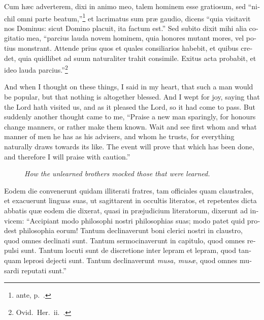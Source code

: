 \documentclass[10pt]{book}
\newcounter{engnote}
\newcommand{\engnotetext}[1]{\vphantom{\footnotemark{}}\footnotetext{#1}}
\newcommand{\blockhead}[4][]{
\begin{figure}
\centering
\vspace{#4}
\parbox{2.75cm}{\begin{center}\footnotesize \color{BrickRed} \emph{#2}\\ #1 \end{center}}
\end{figure}
}
\begin{document}
\begin{paracol}{2}
\switchcolumn*

\begin{otherlanguage}{latin}
Cum h\ae{}c adverterem, dixi in animo meo, talem hominem esse gratiosum, sed ``nichil omni parte beatum,''\footnote[\ddag]{ante, p.\ .} et lacrimatus sum pr\ae{} gaudio, dicens ``quia visitavit nos Dominus: sicut Domino placuit, ita factum est.'' Sed subito dixit mihi alia cogitatio mea, ``parcius lauda novem hominem, quia honores mutant mores, vel potius monstrant. Attende prius quos et quales consiliarios habebit, et quibus credet, quia quidlibet ad suum naturaliter trahit consimile. Exitus acta probabit, et ideo lauda parcius.''\footnote[\textdagger]{Ovid.\ Her.\ ii.\ .}
\end{otherlanguage}

\switchcolumn

And when I thought on these things, I said in my heart, that such a man would be popular, but that nothing is altogether blessed. And I wept for joy, saying that the Lord hath visited us, and as it pleased the Lord, so it had come to pass. But suddenly another thought came to me, ``Praise a new man sparingly, for honours change manners, or rather make them known. Wait and see first whom and what manner of men he has as his advisers, and whom he trusts, for everything naturally draws towards its like. The event will prove that which has been done, and therefore I will praise with caution.''

\switchcolumn*

\begin{otherlanguage}{latin}
\blockhead{How the unlearned brothers mocked those that were learned.}{4}{-.45cm}
Eodem die convenerunt quidam illiterati fratres, tam officiales quam claustrales, et exacuerunt linguas suas,\engnotetext{Ps.\ lxiii.\ \oldstylenums{4}, Vulgate.} ut sagittarent in occultis literatos, et repetentes dicta abbatis qu\ae{} eodem die dixerat, quasi in pr\ae{}judicium literatorum, dixerunt ad invicem: ``Accipiant modo philosophi nostri philosophias suas; modo patet quid prodest philosophia eorum! Tantum declinaverunt boni clerici nostri in claustro, quod omnes declinati sunt. Tantum sermocinaverunt in capitulo, quod omnes repulsi sunt. Tantum locuti sunt de discretione inter lepram et lepram, quod tanquam leprosi dejecti sunt. Tantum declinaverunt \emph{musa, mus\ae{}}, quod omnes musardi reputati sunt.''

\end{otherlanguage}


\end{paracol}
\end{document}
